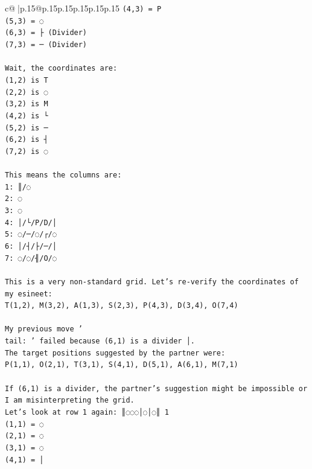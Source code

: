 \documentclass{article}
\begin{document}
{\begin{supertabular}{c@{$\;$}|p{.15\linewidth}@{}p{.15\linewidth}p{.15\linewidth}p{.15\linewidth}p{.15\linewidth}p{.15\linewidth}}
{{{\texttt{(4,3) = P} \\
\texttt{(5,3) = ◌} \\
\texttt{(6,3) = ├ (Divider)} \\
\texttt{(7,3) = ─ (Divider)} \\
\\ 
\texttt{Wait, the coordinates are:} \\
\texttt{(1,2) is T} \\
\texttt{(2,2) is ◌} \\
\texttt{(3,2) is M} \\
\texttt{(4,2) is └} \\
\texttt{(5,2) is ─} \\
\texttt{(6,2) is ┤} \\
\texttt{(7,2) is ◌} \\
\\ 
\texttt{This means the columns are:} \\
\texttt{1: ║/◌} \\
\texttt{2: ◌} \\
\texttt{3: ◌} \\
\texttt{4: │/└/P/D/│} \\
\texttt{5: ◌/─/◌/┌/◌} \\
\texttt{6: │/┤/├/─/│} \\
\texttt{7: ◌/◌/╢/O/◌} \\
\\ 
\texttt{This is a very non{-}standard grid. Let's re{-}verify the coordinates of my esineet:} \\
\texttt{T(1,2), M(3,2), A(1,3), S(2,3), P(4,3), D(3,4), O(7,4)} \\
\\ 
\texttt{My previous move '} \\
\texttt{tail: ' failed because (6,1) is a divider │.} \\
\texttt{The target positions suggested by the partner were:} \\
\texttt{P(1,1), O(2,1), T(3,1), S(4,1), D(5,1), A(6,1), M(7,1)} \\
\\ 
\texttt{If (6,1) is a divider, the partner's suggestion might be impossible or I am misinterpreting the grid.} \\
\texttt{Let's look at row 1 again: ║◌◌◌│◌│◌║ 1} \\
\texttt{(1,1) = ◌} \\
\texttt{(2,1) = ◌} \\
\texttt{(3,1) = ◌} \\
\texttt{(4,1) = │} \\
}}}
\end{supertabular}}
\end{document}
